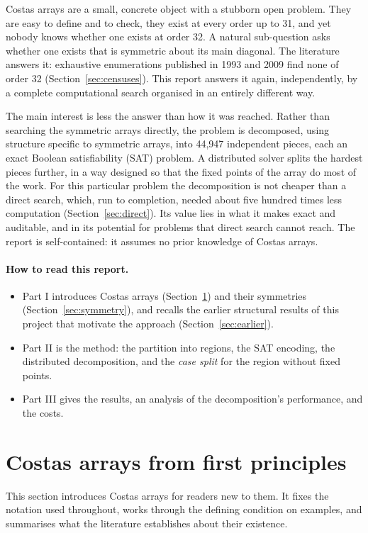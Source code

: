 \documentclass[11pt,a4paper]{article}
\theoremstyle{definition}
\begin{document}

Costas arrays are a small, concrete object with a stubborn open problem. They are easy to
define and to check, they exist at every order up to 31, and yet nobody knows whether one
exists at order 32. A natural sub-question asks whether one exists that is symmetric about its
main diagonal. The literature answers it: exhaustive enumerations published in 1993 and 2009 find
none of order 32 (Section~\ref{sec:censuses}). This report answers it again,
independently, by a complete computational search organised in an entirely different way.

The main interest is less the answer than how it was reached. Rather than searching the symmetric
arrays directly, the problem is decomposed, using structure specific to symmetric arrays, into 44{,}947
independent pieces, each an exact Boolean satisfiability (SAT) problem. A distributed
solver splits the hardest pieces further, in a way designed so that the fixed points of the
array do most of the work. For this particular problem the decomposition is not cheaper than a
direct search, which, run to completion, needed about five hundred times less computation (Section~\ref{sec:direct}).
Its value lies in what it makes exact and auditable, and in its potential for problems that direct
search cannot reach. The report is self-contained: it assumes no prior knowledge of Costas arrays.

\paragraph{How to read this report.}
\begin{itemize}
\item Part I introduces Costas arrays (Section~\ref{sec:primer}) and their
symmetries (Section~\ref{sec:symmetry}), and recalls the earlier structural results of this
project that motivate the approach (Section~\ref{sec:earlier}).
\item Part II is the method: the partition into regions, the SAT encoding, the
distributed decomposition, and the \emph{case split} for the region without fixed points.
\item Part III gives the results, an analysis of the decomposition's performance,
and the costs.
\end{itemize}

\section{Costas arrays from first principles}\label{sec:primer}
This section introduces Costas arrays for readers new to them. It fixes the notation used throughout, works through the defining condition on examples, and summarises what the literature establishes about their existence.
\end{document}
